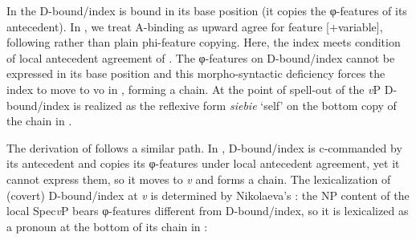 \documentclass[output=paper,modfonts,nonflat
]{langsci/langscibook}
\begin{document}
\z\z

\noindent In  the D-bound/index is bound in its base position (it copies the φ-features of its antecedent). In \cite{witkosetal_forth}, we treat A-binding as upward agree for feature [+variable], following \cite{hicks2009} rather than plain phi-feature copying.  Here, the index meets  condition of local antecedent agreement of . The φ-features on D-bound/index cannot be expressed in its base position and this morpho-syntactic deficiency forces the index to move to vo in , forming a chain. At the point of spell-out of the \textit{v}P D-bound/index is realized as the reflexive form \textit{siebie} ‘self’ on the bottom copy of the chain in .

The derivation of  follows a similar path. In , D-bound/index is c-commanded by its antecedent and copies its φ-features under local antecedent agreement, yet it cannot express them, so it moves to \textit{v} and forms a chain. The lexicalization of (covert) D-bound/index at \textit{v} is determined by Nikolaeva’s : the NP content of the local Spec\textit{v}P bears φ-features different from D-bound/index, so it is lexicalized as a pronoun at the bottom of its chain in :
\end{document}
